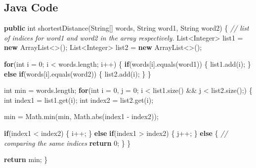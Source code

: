 \documentclass[]{book}
\newenvironment{Shaded}{\begin{snugshade}}{\end{snugshade}}
\newcommand{\BuiltInTok}[1]{#1}
\newcommand{\CommentTok}[1]{\textcolor[rgb]{0.56,0.35,0.01}{\textit{#1}}}
\newcommand{\DataTypeTok}[1]{\textcolor[rgb]{0.13,0.29,0.53}{#1}}
\newcommand{\DecValTok}[1]{\textcolor[rgb]{0.00,0.00,0.81}{#1}}
\newcommand{\FunctionTok}[1]{\textcolor[rgb]{0.00,0.00,0.00}{#1}}
\newcommand{\KeywordTok}[1]{\textcolor[rgb]{0.13,0.29,0.53}{\textbf{#1}}}
\newcommand{\NormalTok}[1]{#1}
\begin{document}
\hypertarget{java-code-33}{%
\subsection{Java Code}\label{java-code-33}}

\begin{Shaded}
\begin{Highlighting}[]
\KeywordTok{public} \DataTypeTok{int} \FunctionTok{shortestDistance}\NormalTok{(}\BuiltInTok{String}\NormalTok{[] words, }\BuiltInTok{String}\NormalTok{ word1, }\BuiltInTok{String}\NormalTok{ word2) \{}
    \CommentTok{// list of indices for word1 and word2 in the array respectively.}
    \BuiltInTok{List}\NormalTok{<}\BuiltInTok{Integer}\NormalTok{> list1 = }\KeywordTok{new} \BuiltInTok{ArrayList}\NormalTok{<>();}
    \BuiltInTok{List}\NormalTok{<}\BuiltInTok{Integer}\NormalTok{> list2 = }\KeywordTok{new} \BuiltInTok{ArrayList}\NormalTok{<>();}

    \KeywordTok{for}\NormalTok{(}\DataTypeTok{int}\NormalTok{ i = }\DecValTok{0}\NormalTok{; i < words.}\FunctionTok{length}\NormalTok{; i++) \{}
        \KeywordTok{if}\NormalTok{(words[i].}\FunctionTok{equals}\NormalTok{(word1)) \{}
\NormalTok{            list1.}\FunctionTok{add}\NormalTok{(i);}
\NormalTok{        \} }\KeywordTok{else} \KeywordTok{if}\NormalTok{(words[i].}\FunctionTok{equals}\NormalTok{(word2)) \{}
\NormalTok{            list2.}\FunctionTok{add}\NormalTok{(i);}
\NormalTok{        \}}
\NormalTok{    \}}

    \DataTypeTok{int}\NormalTok{ min = words.}\FunctionTok{length}\NormalTok{;}
    \KeywordTok{for}\NormalTok{(}\DataTypeTok{int}\NormalTok{ i = }\DecValTok{0}\NormalTok{, j = }\DecValTok{0}\NormalTok{; i < list1.}\FunctionTok{size}\NormalTok{() && j < list2.}\FunctionTok{size}\NormalTok{();) \{}
        \DataTypeTok{int}\NormalTok{ index1 = list1.}\FunctionTok{get}\NormalTok{(i);}
        \DataTypeTok{int}\NormalTok{ index2 = list2.}\FunctionTok{get}\NormalTok{(i);}

\NormalTok{        min = }\BuiltInTok{Math}\NormalTok{.}\FunctionTok{min}\NormalTok{(min, }\BuiltInTok{Math}\NormalTok{.}\FunctionTok{abs}\NormalTok{(index1 - index2));}

        \KeywordTok{if}\NormalTok{(index1 < index2) \{}
\NormalTok{            i++;}
\NormalTok{        \} }\KeywordTok{else} \KeywordTok{if}\NormalTok{(index1 > index2) \{}
\NormalTok{            j++;}
\NormalTok{        \} }\KeywordTok{else}\NormalTok{ \{}
            \CommentTok{// comparing the same indices}
            \KeywordTok{return} \DecValTok{0}\NormalTok{;}
\NormalTok{        \}}
\NormalTok{    \}}

    \KeywordTok{return}\NormalTok{ min;}
\NormalTok{\}}
\end{Highlighting}
\end{Shaded}
\end{document}
